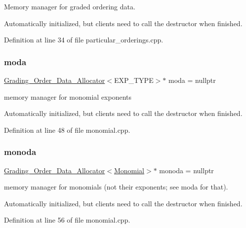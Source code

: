 Memory manager for graded ordering data. 

Automatically initialized, but clients need to call the destructor when finished. 

Definition at line 34 of file particular\+\_\+orderings.\+cpp.

\mbox{\label{group__memorygroup_gaf2c367d23e09c5dad7e0273995a3304c}} 
\subsubsection{\texorpdfstring{moda}{moda}}
{\footnotesize\ttfamily \hyperlink{group__memorygroup_class_grading___order___data___allocator}{Grading\+\_\+\+Order\+\_\+\+Data\+\_\+\+Allocator}$<$E\+X\+P\+\_\+\+T\+Y\+PE$>$$\ast$ moda = nullptr}



memory manager for monomial exponents 

Automatically initialized, but clients need to call the destructor when finished. 

Definition at line 48 of file monomial.\+cpp.

\mbox{\label{group__memorygroup_ga76b5ae808895658b417e3f3a13c60e51}} 
\subsubsection{\texorpdfstring{monoda}{monoda}}
{\footnotesize\ttfamily \hyperlink{group__memorygroup_class_grading___order___data___allocator}{Grading\+\_\+\+Order\+\_\+\+Data\+\_\+\+Allocator}$<$\hyperlink{group__polygroup_class_monomial}{Monomial}$>$$\ast$ monoda = nullptr}



memory manager for monomials (not their exponents; see moda for that). 

Automatically initialized, but clients need to call the destructor when finished. 

Definition at line 56 of file monomial.\+cpp.

\mbox{\label{group__memorygroup_ga2b5eeb775f6c601e624b487f3245983a}} 
